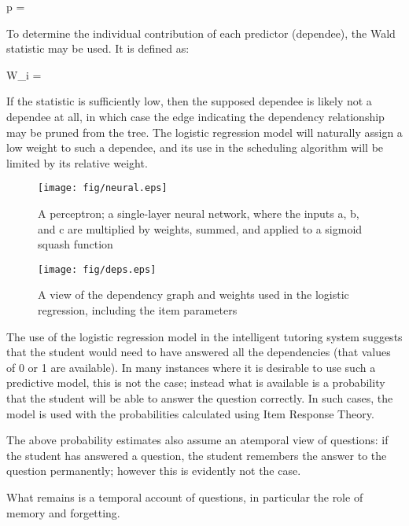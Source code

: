 \begin{equations}
  \label{eq:modirt}
  p = 
\end{equations}

To determine the individual contribution of each predictor (dependee), the
Wald statistic may be used.  It is defined as:

\begin{equations}
  W_i = 
\end{equations}

If the statistic is sufficiently low, then the supposed dependee is likely not
a dependee at all, in which case the edge indicating the dependency
relationship may be pruned from the tree.  The logistic regression model will
naturally assign a low weight to such a dependee, and its use in the scheduling
algorithm will be limited by its relative weight.

\begin{figure}[!p]
\label{fig:neural}
  \centering\texttt{[image: fig/neural.eps]}
\caption{A perceptron; a single-layer neural network, where the inputs a, b, and c
are multiplied by weights, summed, and applied to a sigmoid squash function}
\end{figure}

\begin{figure}[!p]
\label{fig:deps}
  \centering\texttt{[image: fig/deps.eps]}
\caption{A view of the dependency graph and weights used in the logistic regression,
including the item parameters}
\end{figure}

The use of the logistic regression model in the intelligent tutoring system
suggests that the student would need to have answered all the dependencies
(that values of 0 or 1 are available).  In many instances where it is desirable
to use such a predictive model, this is not the case; instead what is available
is a probability that the student will be able to answer the question
correctly.  In such cases, the model is used with the probabilities calculated
using Item Response Theory.

The above probability estimates also assume an atemporal view of questions: if
the student has answered a question, the student remembers the answer to the
question permanently; however this is evidently not the case.  

What remains is a temporal account of questions, in particular the role of
memory and forgetting.


